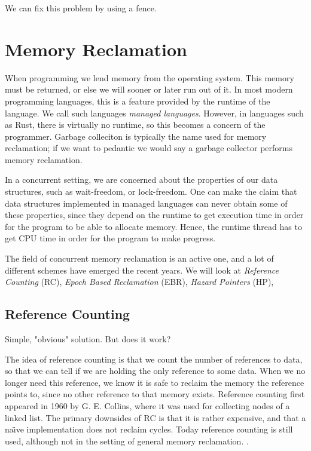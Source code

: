 \documentclass[b5paper,twoside]{report}
\begin{document}
We can fix this problem by using a fence.



\chapter{Memory Reclamation}

When programming we lend memory from the operating system. This memory must be
returned, or else we will sooner or later run out of it.  In most modern
programming languages, this is a feature provided by the runtime of the
language.  We call such languages \emph{managed languages}.  However, in
languages such as Rust, there is virtually no runtime, so this becomes a
concern of the programmer.  Garbage colleciton is typically the name used for
memory reclamation; if we want to pedantic we would say a garbage collector
performs memory reclamation.

In a concurrent setting, we are concerned about the properties of our data
structures,  such as wait-freedom, or lock-freedom.
 One can make the claim that data structures
implemented in managed languages can never obtain some of these properties,
since they depend on the runtime to get execution time in order for the program
to be able to allocate memory.  Hence, the runtime thread has to get CPU time
in order for the program to make progress.  

The field of concurrent memory reclamation is an active one, and a lot of
different schemes have emerged the recent years. We will look at
\emph{Reference Counting} (RC),
\emph{Epoch Based Reclamation} (EBR),
\emph{Hazard Pointers} (HP),




\section{Reference Counting}
Simple, "obvious" solution. But does it work?

 The idea of reference counting is that we count the number of references
to data, so that we can tell if we are holding the only reference to some
data.  When we no longer need this reference, we know it is safe to reclaim the
memory the reference points to, since no other reference to that memory
exists.  Reference counting first appeared in 1960 by G. E.
Collins\cite{collins1960method}, where it was used for collecting nodes of a
linked list.  The primary downsides of RC is that it is rather expensive, and
that a na\"\i{}ve implementation does not reclaim cycles.  Today reference
counting is still used, although not in the setting of general memory
reclamation.  .
\end{document}
